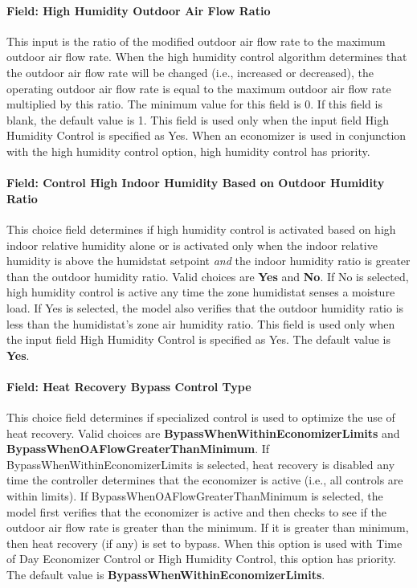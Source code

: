 \paragraph{Field: High Humidity Outdoor Air Flow Ratio}\label{field-high-humidity-outdoor-air-flow-ratio}

This input is the ratio of the modified outdoor air flow rate to the maximum outdoor air flow rate. When the high humidity control algorithm determines that the outdoor air flow rate will be changed (i.e., increased or decreased), the operating outdoor air flow rate is equal to the maximum outdoor air flow rate multiplied by this ratio. The minimum value for this field is 0. If this field is blank, the default value is 1. This field is used only when the input field High Humidity Control is specified as Yes. When an economizer is used in conjunction with the high humidity control option, high humidity control has priority.

\paragraph{Field: Control High Indoor Humidity Based on Outdoor Humidity Ratio}\label{field-control-high-indoor-humidity-based-on-outdoor-humidity-ratio}

This choice field determines if high humidity control is activated based on high indoor relative humidity alone or is activated only when the indoor relative humidity is above the humidstat setpoint \emph{and} the indoor humidity ratio is greater than the outdoor humidity ratio. Valid choices are \textbf{Yes} and \textbf{No}. If No is selected, high humidity control is active any time the zone humidistat senses a moisture load. If Yes is selected, the model also verifies that the outdoor humidity ratio is less than the humidistat's zone air humidity ratio. This field is used only when the input field High Humidity Control is specified as Yes. The default value is \textbf{Yes}.

\paragraph{Field: Heat Recovery Bypass Control Type}\label{field-heat-recovery-bypass-control-type}

This choice field determines if specialized control is used to optimize the use of heat recovery. Valid choices are \textbf{BypassWhenWithinEconomizerLimits} and \textbf{BypassWhenOAFlowGreaterThanMinimum}. If BypassWhenWithinEconomizerLimits is selected, heat recovery is disabled any time the controller determines that the economizer is active (i.e., all controls are within limits). If BypassWhenOAFlowGreaterThanMinimum is selected, the model first verifies that the economizer is active and then checks to see if the outdoor air flow rate is greater than the minimum. If it is greater than minimum, then heat recovery (if any) is set to bypass. When this option is used with Time of Day Economizer Control or High Humidity Control, this option has priority. The default value is \textbf{BypassWhenWithinEconomizerLimits}.

